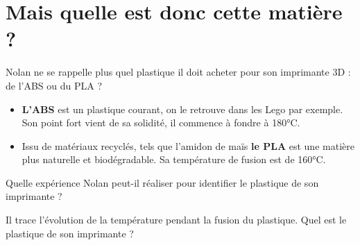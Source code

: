 \section{Mais quelle est donc cette matière ?}

Nolan ne se rappelle plus quel plastique il doit acheter pour son imprimante 3D : de l'ABS ou du PLA ?

\begin{itemize}
	\item \textbf{L'ABS} est un plastique courant, on le retrouve dans les Lego par exemple. Son point fort vient de sa solidité, il commence à fondre à 180°C.
	
	\item Issu de matériaux recyclés, tels que l'amidon de maïs \textbf{le PLA} est une matière plus naturelle et biodégradable. Sa température de fusion est de 160°C.	
\end{itemize}

\begin{questions}
	\question Quelle expérience Nolan peut-il réaliser pour identifier le plastique de son imprimante ?
	
	\question Il trace l'évolution de la température pendant la fusion du plastique. Quel est le plastique de son imprimante ?
\end{questions}